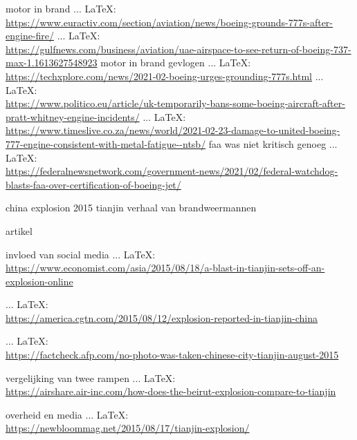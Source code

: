 \begin{thebibliography}{99}
{{{motor in brand
 ... \LaTeX:\\ \url{https://www.euractiv.com/section/aviation/news/boeing-grounds-777s-after-engine-fire/}
 ... \LaTeX:\\ \url{https://gulfnews.com/business/aviation/uae-airspace-to-see-return-of-boeing-737-max-1.1613627548923}
motor in brand gevlogen
 ... \LaTeX:\\ \url{https://techxplore.com/news/2021-02-boeing-urges-grounding-777s.html}
 ... \LaTeX:\\ \url{https://www.politico.eu/article/uk-temporarily-bans-some-boeing-aircraft-after-pratt-whitney-engine-incidents/}
 ... \LaTeX:\\ \url{https://www.timeslive.co.za/news/world/2021-02-23-damage-to-united-boeing-777-engine-consistent-with-metal-fatigue--ntsb/}
faa was niet kritisch genoeg
 ... \LaTeX:\\ \url{https://federalnewsnetwork.com/government-news/2021/02/federal-watchdog-blasts-faa-over-certification-of-boeing-jet/}







china explosion 2015 tianjin
    verhaal van brandweermannen
    
    artikel
    
    invloed van social media
     ... \LaTeX:\\ \url{https://www.economist.com/asia/2015/08/18/a-blast-in-tianjin-sets-off-an-explosion-online}

     ... \LaTeX:\\ \url{https://america.cgtn.com/2015/08/12/explosion-reported-in-tianjin-china}

     ... \LaTeX:\\ \url{https://factcheck.afp.com/no-photo-was-taken-chinese-city-tianjin-august-2015}

    vergelijking van twee rampen
     ... \LaTeX:\\ \url{https://airshare.air-inc.com/how-does-the-beirut-explosion-compare-to-tianjin}

    overheid en media
     ... \LaTeX:\\ \url{https://newbloommag.net/2015/08/17/tianjin-explosion/}

}}}
\end{thebibliography}
